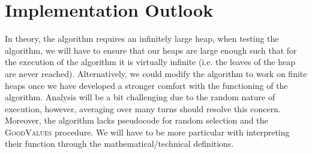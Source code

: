 \documentclass{article}
\begin{document}
\section{Implementation Outlook}
In theory, the algorithm requires an infinitely large heap, when testing the algorithm, we will have to ensure that our heaps are large enough such that for the execution of the algorithm it is virtually infinite (i.e. the leaves of the heap are never reached). Alternatively, we could modify the algorithm to work on finite heaps once we have developed a stronger comfort with the functioning of the algorithm. Analysis will be a bit challenging due to the random nature of execution, however, averaging over many turns should resolve this concern. Moreover, the algorithm lacks pseudocode for random selection and the \textsc{GoodValues} procedure. We will have to be more particular with interpreting their function through the mathematical/technical definitions.



\end{document}
